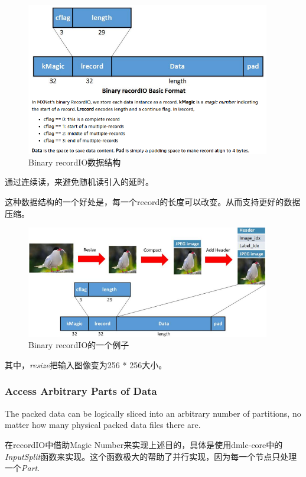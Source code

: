 \begin{figure}[!hbtp]
\centering
\includegraphics[width=0.95\textwidth]{MXNet/recordIO1.png}
\caption{Binary recordIO数据结构}
\label{recordIO1}
\end{figure}

通过连续读，来避免随机读引入的延时。

这种数据结构的一个好处是，每一个record的长度可以改变。从而支持更好的数据压缩。

\begin{figure}[!hbtp]
\centering
\includegraphics[width=0.95\textwidth]{MXNet/recordIO2.png}
\caption{Binary recordIO的一个例子}
\label{recordIO2}
\end{figure}
其中，\textit{resize}把输入图像变为256 * 256大小。


\subsubsection{Access Arbitrary Parts of Data}

The packed data can be logically sliced into an arbitrary number of partitions, no matter how many physical packed data files there are.

在recordIO中借助Magic Number来实现上述目的，具体是使用dmlc-core中的\textit{InputSplit}函数来实现。这个函数极大的帮助了并行实现，因为每一个节点只处理一个\textit{Part}.

